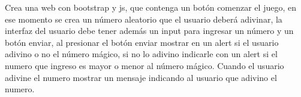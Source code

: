 Crea una web con bootstrap y js, que contenga un botón comenzar el juego, en
ese momento se crea un número aleatorio que el usuario deberá adivinar, la
interfaz del usuario debe tener además un input para ingresar un número y un
botón enviar, al presionar el botón enviar mostrar en un alert si el usuario adivino
o no el número mágico, si no lo adivino indicarle con un alert si el numero que
ingreso es mayor o menor al número mágico.
Cuando el usuario adivine el numero mostrar un mensaje indicando al usuario que
adivino el numero.
